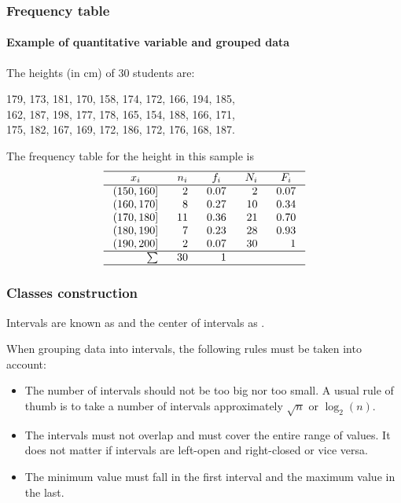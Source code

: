 \begin{frame}
\frametitle{Frequency table}
\framesubtitle{Example of quantitative variable and grouped data}
The heights (in cm) of 30 students are:
\begin{center}
179, 173, 181, 170, 158, 174, 172, 166, 194, 185,\\
162, 187, 198, 177, 178, 165, 154, 188, 166, 171,\\
175, 182, 167, 169, 172, 186, 172, 176, 168, 187.
\end{center}
The frequency table for the height in this sample is
\[
\setlength\arraycolsep{3mm}
\setlength\arrayrulewidth{0.5pt}
\begin{array}{rrrrr}
\hline
\multicolumn{1}{c}{x_i} & \multicolumn{1}{c}{n_i} & \multicolumn{1}{c}{f_i} & \multicolumn{1}{c}{N_i} & \multicolumn{1}{c}{F_i}\\
\hline
(150,160] & 2 & 0.07 & 2 & 0.07\\
(160,170] & 8 & 0.27 & 10 & 0.34\\
(170,180] & 11 & 0.36 & 21 & 0.70\\
(180,190] & 7  & 0.23 & 28 & 0.93\\
(190,200] & 2 & 0.07 & 30 & 1 \\
\hline
\sum & 30 & 1 \\
\hline
\end{array}
\]
\end{frame}


\begin{frame}
\frametitle{Classes construction}
Intervals are known as  and the center of intervals as .

When grouping data into intervals, the following rules must be taken into account: 
\begin{itemize}
\item The number of intervals should not be too big nor too small. 
A usual rule of thumb is to take a number of intervals approximately $\sqrt{n}$ or $\log_2(n)$.
\item The intervals must not overlap and must cover the entire range of values.
It does not matter if intervals are left-open and right-closed or vice versa. 
\item The minimum value must fall in the first interval and the maximum value in the last.
\end{itemize}
\end{frame}


